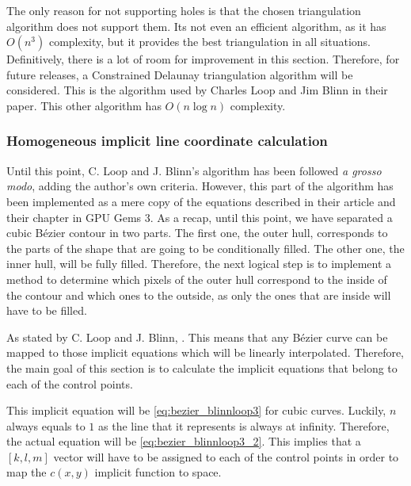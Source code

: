 \documentclass[\topdir/main.tex]{subfiles}
\begin{document}
The only reason for not supporting holes is that the chosen triangulation algorithm does not support them. Its not even an efficient algorithm, as it has $O(n^3)$ complexity, but it provides the best triangulation in all situations. Definitively, there is a lot of room for improvement in this section. Therefore, for future releases, a Constrained Delaunay triangulation algorithm will be considered. This is the algorithm used by Charles Loop and Jim Blinn in their paper\cite{loopblinn2005}. This other algorithm has $O(n \log n)$ complexity\cite{wiki:constrained_delaunay}.\newline

\subsubsection{Homogeneous implicit line coordinate calculation}
Until this point, C. Loop and J. Blinn's algorithm has been followed \textit{a grosso modo}, adding the author's own criteria. However, this part of the algorithm has been implemented as a mere copy of the equations described in their article\cite{loopblinn2005} and their chapter in GPU Gems 3\cite{GPUGems3C26}. As a recap, until this point, we have separated a cubic Bézier contour in two parts. The first one, the outer hull, corresponds to the parts of the shape that are going to be conditionally filled. The other one, the inner hull, will be fully filled. Therefore, the next logical step is to implement a method to determine which pixels of the outer hull correspond to the inside of the contour and which ones to the outside, as only the ones that are inside will have to be filled.\newline

As stated by C. Loop and J. Blinn, \cite{loopblinn2005}. This means that any Bézier curve can be mapped to those implicit equations which will be linearly interpolated. Therefore, the main goal of this section is to calculate the implicit equations that belong to each of the control points.\newline

This implicit equation will be \eqref{eq:bezier_blinnloop3} for cubic curves. Luckily, $n$ always equals to $1$ as the line that it represents is always at infinity. Therefore, the actual equation will be \eqref{eq:bezier_blinnloop3_2}. This implies that a $[k, l, m]$ vector will have to be assigned to each of the control points in order to map the $c(x, y)$ implicit function to space.
\end{document}
